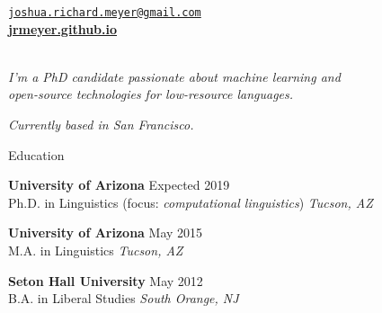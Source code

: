 \documentclass{resume} %
\begin{document}
\vspace{-.25cm}
\begin{center}
  \href{mailto:joshua.richard.meyer@gmail.com}{\nolinkurl{joshua.richard.meyer@gmail.com}}\\
  \vspace{.15cm}
  \href{https://jrmeyer.github.io}{\textbf{jrmeyer.github.io}} \\
  \vspace{.15cm}
  \href{https://github.com/JRMeyer}{\faGithub} \hspace{.25cm} \href{https://www.linkedin.com/in/josh-r-meyer/}{\faLinkedin} \\

\vspace{.5cm}

\textit{I'm a PhD candidate passionate about machine learning and \\
  open-source technologies for low-resource languages.}

\vspace{.5cm}

\textit{Currently based in San Francisco.}
\end{center}


\vspace{.5cm}
\begin{rSection}{Education}

{\bf University of Arizona} \hfill {Expected 2019} \\ 
Ph.D. in Linguistics (focus: \textit{computational linguistics}) \hfill {\em Tucson, AZ}

\vspace{.15cm}

{\bf University of Arizona} \hfill {May 2015} \\ 
M.A. in Linguistics \hfill {\em Tucson, AZ}

\vspace{.15cm}

{\bf Seton Hall University} \hfill {May 2012} \\ 
B.A. in Liberal Studies  \hfill {\em South Orange, NJ} \\



\end{rSection}
\end{document}
